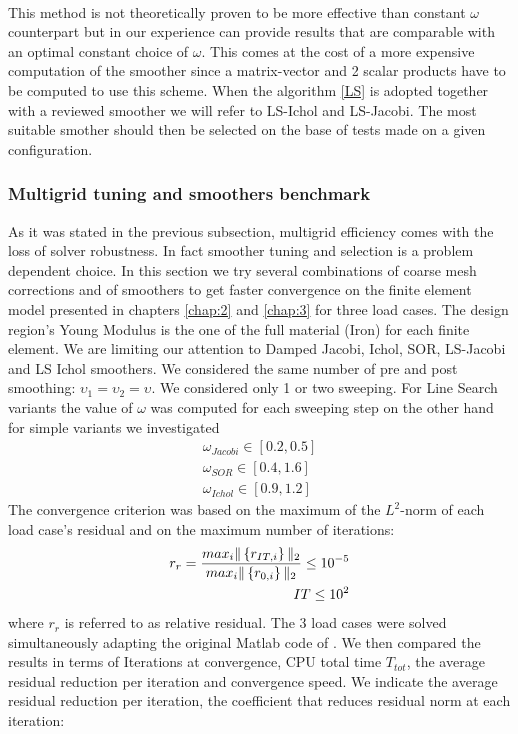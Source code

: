  \\
 This method is not theoretically proven to be more effective than constant $\omega$ counterpart but in our experience can provide results that are comparable with an optimal constant choice of $\omega$. This comes at the cost of a more expensive computation of the smoother since a matrix-vector and 2 scalar products have to be computed to use this scheme. When the algorithm \ref{LS} is adopted together with a reviewed smoother we will refer to LS-Ichol and LS-Jacobi. The most suitable smother should then be selected on the base of tests made on a given configuration.
 \subsubsection{Multigrid tuning and smoothers benchmark}
 As it was stated in the previous subsection, multigrid efficiency comes with the loss of solver robustness. In fact smoother tuning and selection is a problem dependent choice.
 In this section we try several combinations of coarse mesh corrections and of smoothers to get faster convergence on the finite element model presented in chapters \ref{chap:2} and \ref{chap:3} for three load cases. The design region's Young Modulus is the one of the full material (Iron) for each finite element.
 We are limiting our attention to Damped Jacobi, Ichol, SOR, LS-Jacobi and LS Ichol smoothers. We considered the same number of pre and post smoothing: $\upsilon_1=\upsilon_2=\upsilon$. We considered only 1 or two sweeping. For Line Search variants the value of $\omega$ was computed for each sweeping step on the other hand for simple variants we investigated
 \begin{eqnarray}
\omega_{Jacobi}\in[0.2,0.5]\\
\omega_{SOR} \in [0.4,1.6]\\
\omega_{Ichol} \in [0.9,1.2]
 \end{eqnarray}
 The convergence criterion was based on the maximum of the $L^2$-norm of each load case's residual and on the maximum number of iterations:
 \begin{eqnarray}
 r_r=\frac{max_i\|\left\lbrace{r_{IT,i}}\right \rbrace\|_2}{max_i\|\left\lbrace{r_{0,i}}\right \rbrace\|_2}\leq 10^{-5}\\
  IT\leq 10^{2}
 \end{eqnarray}
 where $ r_r$ is referred to as relative residual.
  The 3 load cases were solved simultaneously adapting the original Matlab code of \cite{amir2014multigrid}.
 We then compared the results in terms of Iterations at convergence, CPU total time $T_{tot}$, the average residual reduction per iteration and convergence speed. We indicate the average residual reduction per iteration, the coefficient that reduces residual norm at each iteration:
